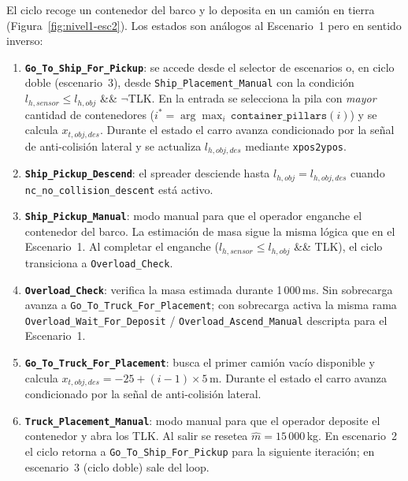 \documentclass[12pt, a4paper]{article}
\begin{document}
El ciclo recoge un contenedor del barco y lo deposita en un camión en tierra
(Figura~\ref{fig:nivel1-esc2}). Los estados son análogos al Escenario~1 pero en
sentido inverso:

\begin{enumerate}\sloppy
    \item \textbf{\texttt{Go\_To\_Ship\_For\_Pickup}}: se accede desde el selector de
    escenarios o, en ciclo doble (escenario~3), desde \texttt{Ship\_Placement\_Manual}
    con la condición $l_{h,sensor} \leq l_{h,obj}$ \&\& $\lnot$TLK. En la entrada se
    selecciona la pila con \textit{mayor} cantidad de contenedores
    ($i^* = \arg\max_i\,\mathtt{container\_pillars}(i)$) y se calcula $x_{t,obj,des}$.
    Durante el estado el carro avanza condicionado por la señal de anti-colisión
    lateral y se actualiza $l_{h,obj,des}$ mediante \texttt{xpos2ypos}.

    \item \textbf{\texttt{Ship\_Pickup\_Descend}}: el spreader desciende hasta
    $l_{h,obj} = l_{h,obj,des}$ cuando \texttt{nc\_no\_collision\_descent} está activo.

    \item \textbf{\texttt{Ship\_Pickup\_Manual}}: modo manual para que el operador
    enganche el contenedor del barco. La estimación de masa sigue la misma lógica
    que en el Escenario~1. Al completar el enganche
    ($l_{h,sensor} \leq l_{h,obj}$ \&\& TLK), el ciclo transiciona a
    \texttt{Overload\_Check}.

    \item \textbf{\texttt{Overload\_Check}}: verifica la masa estimada durante
    1\,000\,ms. Sin sobrecarga avanza a \texttt{Go\_To\_Truck\_For\_Placement}; con
    sobrecarga activa la misma rama \texttt{Overload\_Wait\_For\_Deposit} /
    \texttt{Overload\_Ascend\_Manual} descripta para el Escenario~1.

    \item \textbf{\texttt{Go\_To\_Truck\_For\_Placement}}: busca el primer camión
    vacío disponible y calcula $x_{t,obj,des} = -25 + (i-1)\times 5$\,m. Durante
    el estado el carro avanza condicionado por la señal de anti-colisión lateral.

    \item \textbf{\texttt{Truck\_Placement\_Manual}}: modo manual para que el operador
    deposite el contenedor y abra los TLK. Al salir se resetea $\hat{m} = 15\,000$\,kg.
    En escenario~2 el ciclo retorna a \texttt{Go\_To\_Ship\_For\_Pickup} para la
    siguiente iteración; en escenario~3 (ciclo doble) sale del loop.
\end{enumerate}
\end{document}
